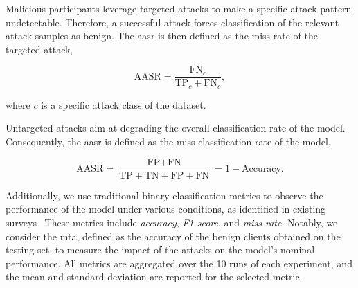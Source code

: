 \begin{description}[font=\normalfont\textit]
  \item[Targeted attacks:]
    Malicious participants leverage targeted attacks to make a specific attack pattern undetectable.
    Therefore, a successful attack forces classification of the relevant attack samples as benign.
    The \gls{aasr} is then defined as the miss rate of the targeted attack, \ie

    \begin{equation}
      \label{eq:aasr_targeted}
      \text{AASR} = \frac
        {\text{FN}_c}
        {\text{TP}_c + \text{FN}_c},
    \end{equation}

    where $c$ is a specific attack class of the dataset.

  \item[Untargeted Attacks:]
    Untargeted attacks aim at degrading the overall classification rate of the model.
    Consequently, the \gls{aasr} is defined as the miss-classification rate of the model, \ie

    \begin{equation}
      \label{eq:aasr_untargeted}
      \text{AASR} = \frac
        {\text{FP} + \text{FN}}
        {\text{TP} + \text{TN} + \text{FP} + \text{FN}}
        = 1 - \text{Accuracy}.
    \end{equation}
\end{description}

Additionally, we use traditional binary classification metrics to observe the performance of the model under various conditions, as identified in existing surveys~\cite{campos_EvaluatingFederatedLearning_2022,lavaur_tnsm_2022}
These metrics include \emph{accuracy}, \emph{F1-score}, and \emph{miss rate}.
Notably, we consider the \gls{mta}, defined as the accuracy of the benign clients obtained on the testing set, to measure the impact of the attacks on the model's nominal performance.
All metrics are aggregated over the 10 runs of each experiment, and the mean and standard deviation are reported for the selected metric.